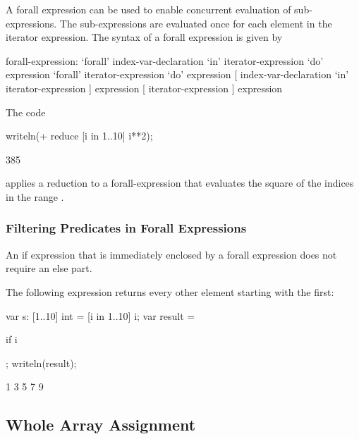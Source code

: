 A forall expression can be used to enable concurrent evaluation of
sub-expressions.  The sub-expressions are evaluated once for each
element in the iterator expression.  The syntax of a forall expression
is given by
\begin{syntax}
forall-expression:
  `forall' index-var-declaration `in' iterator-expression `do' expression
  `forall' iterator-expression `do' expression
  [ index-var-declaration `in' iterator-expression ] expression
  [ iterator-expression ] expression
\end{syntax}

\begin{example}
The code
\begin{chapelpre}
\end{chapelpre}
\begin{chapel}
writeln(+ reduce [i in 1..10] i**2);
\end{chapel}
\begin{chapeloutput}
385
\end{chapeloutput}
applies a reduction to a forall-expression that evaluates the square
of the indices in the range .
\end{example}

\subsubsection{Filtering Predicates in Forall Expressions}
\label{Filtering_Predicates_Forall}

An if expression that is immediately enclosed by a forall expression
does not require an else part.
\begin{example}
The following expression returns every other element starting with the
first:
\begin{chapelpre}
var s: [1..10] int = [i in 1..10] i;
var result =
\end{chapelpre}
\begin{chapel}
[i in 1..s.numElements] if i %
\end{chapel}
\begin{chapelpost}
;
writeln(result);
\end{chapelpost}
\begin{chapeloutput}
1 3 5 7 9
\end{chapeloutput}
\end{example}

\subsection{Whole Array Assignment}

